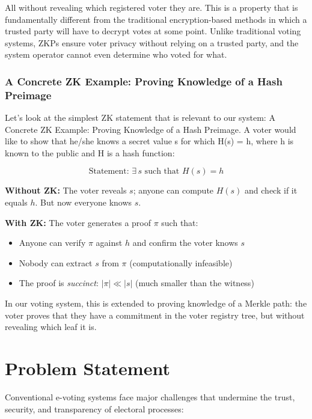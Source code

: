 \documentclass[12pt, a4paper]{report}
\begin{document}
All without revealing which registered voter they are. This is a property that is fundamentally different from the traditional encryption-based methods in which a trusted party will have to decrypt votes at some point. Unlike traditional voting systems, ZKPs ensure voter privacy without relying on a trusted party, and the system operator cannot even determine who voted for what.

\subsubsection{A Concrete ZK Example: Proving Knowledge of a Hash Preimage}

Let's look at the simplest ZK statement that is relevant to our system: A Concrete ZK Example: Proving Knowledge of a Hash Preimage. A voter would like to show that he/she knows a secret value s for which H(s) = h, where h is known to the public and H is a hash function:

\begin{equation}
\text{Statement: } \exists \, s \text{ such that } H(s) = h
\label{eq:hash_preimage}
\end{equation}

\textbf{Without ZK:} The voter reveals $s$; anyone can compute $H(s)$ and check if it equals $h$. But now everyone knows $s$.

\textbf{With ZK:} The voter generates a proof $\pi$ such that:
\begin{itemize}
    \item Anyone can verify $\pi$ against $h$ and confirm the voter knows $s$
    \item Nobody can extract $s$ from $\pi$ (computationally infeasible)
    \item The proof is \textit{succinct}: $|\pi| \ll |s|$ (much smaller than the witness)
\end{itemize}

In our voting system, this is extended to proving knowledge of a Merkle path: the voter proves that they have a commitment in the voter registry tree, but without revealing which leaf it is.

\newpage
\section{Problem Statement}
Conventional e-voting systems face major challenges that undermine the trust, security, and transparency of electoral processes:
\end{document}
